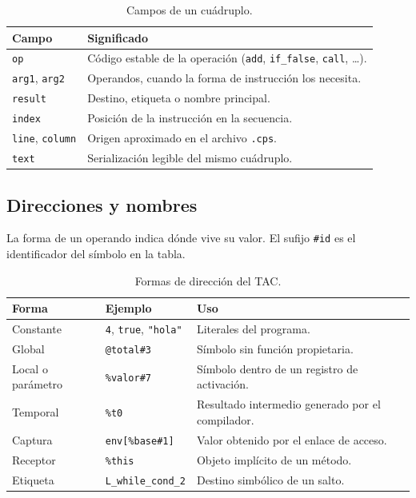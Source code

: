 \documentclass[11pt,a4paper]{article}
\begin{document}
\begin{table}[H]
\centering
\small
\begin{tabular}{@{}lL{11.2cm}@{}}
\toprule
\textbf{Campo} & \textbf{Significado} \\
\midrule
\texttt{op} & Código estable de la operación (\texttt{add}, \texttt{if\_false},
\texttt{call}, \dots). \\
\texttt{arg1}, \texttt{arg2} & Operandos, cuando la forma de instrucción los
necesita. \\
\texttt{result} & Destino, etiqueta o nombre principal. \\
\texttt{index} & Posición de la instrucción en la secuencia. \\
\texttt{line}, \texttt{column} & Origen aproximado en el archivo \texttt{.cps}. \\
\texttt{text} & Serialización legible del mismo cuádruplo. \\
\bottomrule
\end{tabular}
\caption{Campos de un cuádruplo.}
\end{table}

\subsection{Direcciones y nombres}

La forma de un operando indica dónde vive su valor. El sufijo \texttt{\#id} es el
identificador del símbolo en la tabla.

\begin{table}[H]
\centering
\small
\begin{tabular}{@{}L{3.2cm}L{4.0cm}L{7.2cm}@{}}
\toprule
\textbf{Forma} & \textbf{Ejemplo} & \textbf{Uso} \\
\midrule
Constante & \texttt{4}, \texttt{true}, \texttt{"hola"} & Literales del programa. \\
Global & \texttt{@total\#3} & Símbolo sin función propietaria. \\
Local o parámetro & \texttt{\%valor\#7} & Símbolo dentro de un registro de
activación. \\
Temporal & \texttt{\%t0} & Resultado intermedio generado por el compilador. \\
Captura & \texttt{env[\%base\#1]} & Valor obtenido por el enlace de acceso. \\
Receptor & \texttt{\%this} & Objeto implícito de un método. \\
Etiqueta & \texttt{L\_while\_cond\_2} & Destino simbólico de un salto. \\
\bottomrule
\end{tabular}
\caption{Formas de dirección del TAC.}
\end{table}
\end{document}
